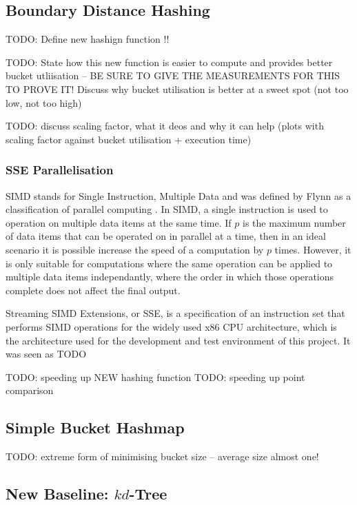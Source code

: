 \subsection{Boundary Distance Hashing}

TODO: Define new hashign function !!

TODO: State how this new function is easier to compute and provides better bucket utliisation -- BE SURE TO GIVE THE MEASUREMENTS FOR THIS TO PROVE IT! Discuss why bucket utilisation is better at a sweet spot (not too low, not too high)

TODO: discuss scaling factor, what it deos and why it can help (plots with scaling factor against bucket utilisation + execution time)

\subsubsection{SSE Parallelisation}

SIMD stands for Single Instruction, Multiple Data and was defined by Flynn as a classification of parallel computing \cite{flynns-taxonomy}. In SIMD, a single instruction is used to operation on multiple data items at the same time. If $p$ is the maximum number of data items that can be operated on in parallel at a time, then in an ideal scenario it is possible increase the speed of a computation by $p$ times. However, it is only suitable for computations where the same operation can be applied to multiple data items independantly, where the order in which those operations complete does not affect the final output.

Streaming SIMD Extensions, or SSE, is a specification of an instruction set that performs SIMD operations for the widely used x86 CPU architecture\cite{sse}, which is the architecture used for the development and test environment of this project. It was seen as TODO

TODO: speeding up NEW hashing function
TODO: speeding up point comparison

\subsection{Simple Bucket Hashmap}

TODO: extreme form of minimising bucket size -- average size almost one!

\subsection{New Baseline: $kd$-Tree}

